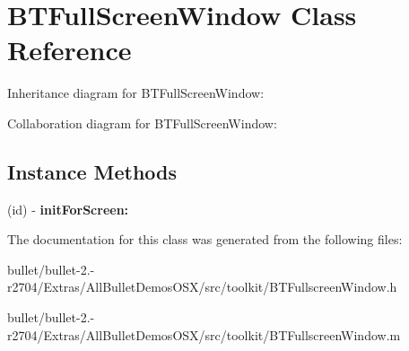 \hypertarget{interface_b_t_full_screen_window}{\section{B\+T\+Full\+Screen\+Window Class Reference}
\label{interface_b_t_full_screen_window}
}


Inheritance diagram for B\+T\+Full\+Screen\+Window\+:


Collaboration diagram for B\+T\+Full\+Screen\+Window\+:
\subsection*{Instance Methods}
\begin{DoxyCompactItemize}
\item 
\hypertarget{interface_b_t_full_screen_window_ae790bbafb159ca44447827d79f61b896}{(id) -\/ {\bfseries init\+For\+Screen\+:}}\label{interface_b_t_full_screen_window_ae790bbafb159ca44447827d79f61b896}

\end{DoxyCompactItemize}


The documentation for this class was generated from the following files\+:\begin{DoxyCompactItemize}
\item 
bullet/bullet-\/2.-\/r2704/\+Extras/\+All\+Bullet\+Demos\+O\+S\+X/src/toolkit/B\+T\+Fullscreen\+Window.\+h\item 
bullet/bullet-\/2.-\/r2704/\+Extras/\+All\+Bullet\+Demos\+O\+S\+X/src/toolkit/B\+T\+Fullscreen\+Window.\+m\end{DoxyCompactItemize}
